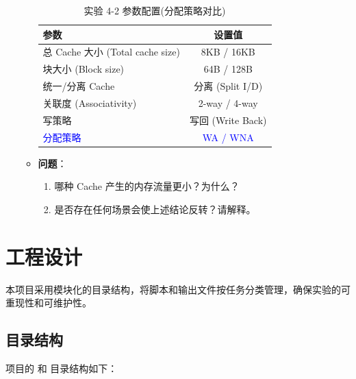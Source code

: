 \documentclass[12pt,a4paper]{article}
\begin{document}
\begin{itemize}
\begin{itemize}
    \begin{table}[H]
    \centering
    \small
    \begin{tabular}{lc}
    \toprule
    \textbf{参数} & \textbf{设置值} \\
    \midrule
    总 Cache 大小 (Total cache size) & 8KB / 16KB \\
    块大小 (Block size) & 64B / 128B \\
    统一/分离 Cache & 分离 (Split I/D) \\
    关联度 (Associativity) & 2-way / 4-way \\
    写策略 & 写回 (Write Back) \\
    \textcolor{blue}{分配策略} & \textcolor{blue}{WA / WNA} \\
    \bottomrule
    \end{tabular}
    \caption{实验 4-2 参数配置(分配策略对比)}
    \end{table}
        \item \textbf{问题}：
        \begin{enumerate}
            \item 哪种 Cache 产生的内存流量更小？为什么？
            \item 是否存在任何场景会使上述结论反转？请解释。
        \end{enumerate}
    \end{itemize}
\end{itemize}

\clearpage
\section{工程设计}

本项目采用模块化的目录结构，将脚本和输出文件按任务分类管理，确保实验的可重现性和可维护性。

\subsection{目录结构}

项目的  和  目录结构如下：
\end{document}
